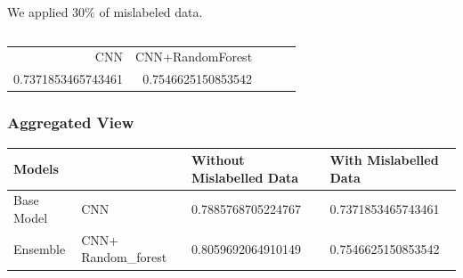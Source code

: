 \documentclass{article}
\begin{document}
We applied 30\% of mislabeled data. 

\inputminted[firstline=32,lastline=54,frame=single,framesep=10pt,fontsize=\footnotesize]{python}{cifar10-mislabeled/main.py}


\begin{table}[H]
    \centering
    \begin{tabular}{rrrrr}
        CNN &  CNN+RandomForest   \\
        0.7371853465743461 &       0.7546625150853542  \\
    \end{tabular}
\end{table}


\subsubsection{Aggregated View}

\begin{table}[H]
    \begin{tabular}{|l|l|l|l|}
    \hline
    \multicolumn{2}{|l|}{Models}     & Without Mislabelled Data & With Mislabelled Data \\ \hline
    Base Model & CNN                 & 0.7885768705224767       & 0.7371853465743461    \\ \hline
    Ensemble   & CNN+ Random\_forest & 0.8059692064910149       & 0.7546625150853542    \\ \hline
    \end{tabular}
\end{table}




\end{document}
